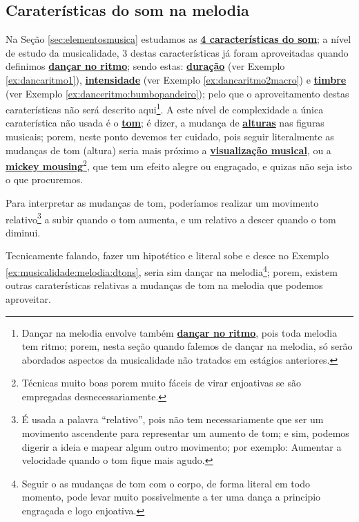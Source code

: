 \subsection{Caraterísticas do som na melodia} 
Na 
Seção \ref{sec:elementosmusica} estudamos as \hyperref[sec:carateristasom]{\textbf{4 características do som}};
a nível de estudo da musicalidade, 
3 destas características já foram aproveitadas quando definimos \hyperref[subsec:dancaritmo]{\textbf{dançar no ritmo}};
sendo estas: 
\hyperref[sec:pos:Duracion]{\textbf{duração}} (ver Exemplo \ref{ex:dancaritmo1}), 
\hyperref[sec:pos:Intensidade]{\textbf{intensidade}} (ver Exemplo \ref{ex:dancaritmo2macro}) e 
\hyperref[sec:pos:timbre]{\textbf{timbre}} (ver Exemplo \ref{ex:danceritmo:bumbopandeiro});
pelo que o aproveitamento destas caraterísticas não será descrito aqui\footnote{\label{footn:melodiatemritmo}Dançar 
na melodia envolve também \hyperref[subsec:dancaritmo]{\textbf{dançar no ritmo}}, 
pois toda melodia tem ritmo; 
porem, nesta seção quando falemos de dançar na melodia, 
só serão abordados aspectos da musicalidade não tratados em estágios anteriores.}.
A este nível de complexidade a única caraterística não usada é 
o \hyperref[sec:pos:Altura]{\textbf{tom}};
é dizer, a mudança de \hyperref[sec:pos:Altura]{\textbf{alturas}} nas figuras musicais;
porem, neste ponto devemos ter cuidado, 
pois seguir literalmente as mudanças de tom (altura)
seria mais próximo a \hyperref[subsubsec:musicvisualization]{\textbf{visualização musical}},
 ou a \hyperref[sec:mikeymousing]{\textbf{mickey mousing}}\footnote{Técnicas 
muito boas porem muito fáceis de virar enjoativas se são empregadas desnecessariamente.},
que tem um efeito alegre ou engraçado, e quizas não seja isto o que procuremos.


\begin{example} 
\label{ex:musicalidade:melodia:dtons}
Para interpretar as mudanças de tom, 
poderíamos realizar um movimento relativo\footnote{É usada a palavra ``relativo'',
pois não tem necessariamente que ser um movimento ascendente para representar um aumento de tom;
e sim, podemos digerir a ideia e mapear algum outro movimento; 
por exemplo: Aumentar a velocidade quando o tom fique mais agudo.} 
a subir quando o tom aumenta,
e um relativo a descer quando o tom diminui.
\end{example}

Tecnicamente falando, 
fazer um hipotético e literal sobe e desce no Exemplo \ref{ex:musicalidade:melodia:dtons}, 
seria sim dançar na melodia\footnote{Seguir o as mudanças de tom com o corpo, 
de forma literal em todo momento, 
pode levar muito possivelmente a ter uma dança a principio engraçada e logo enjoativa.};
porem, 
existem outras caraterísticas relativas a mudanças de tom na melodia que podemos aproveitar. 

